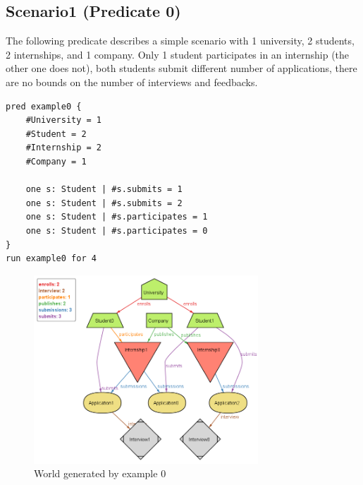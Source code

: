\subsection{Scenario1 (Predicate 0)}
The following predicate describes a simple scenario with 1 university, 2 students, 2 internships, and 1 company.
Only 1 student participates in an internship (the other one does not), both students submit different number of applications, 
there are no bounds on the number of interviews and feedbacks.
\begin{lstlisting}
pred example0 {
    #University = 1
    #Student = 2
    #Internship = 2
    #Company = 1

    one s: Student | #s.submits = 1
    one s: Student | #s.submits = 2
    one s: Student | #s.participates = 1
    one s: Student | #s.participates = 0
} 
run example0 for 4
\end{lstlisting}
\begin{figure}[H]
    \centering
    \includegraphics[width=0.75\textwidth]{Images/Alloy/example0.png}
    \caption{World generated by example 0}\label{fig:example0}
\end{figure}

